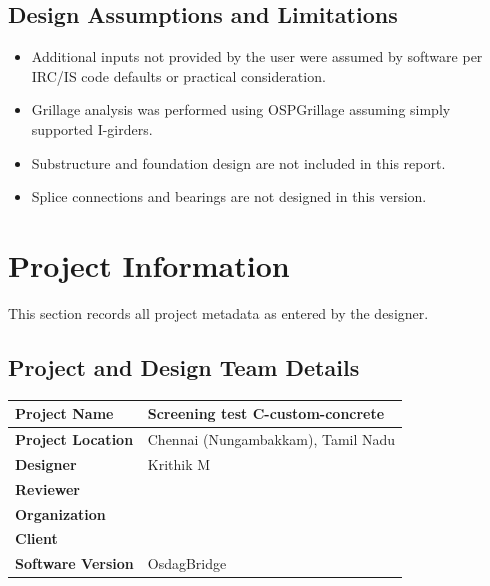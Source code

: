\documentclass[12pt,a4paper]{report}
\numberwithin{table}{chapter}
\numberwithin{figure}{chapter}
\begin{document}
\section*{Design Assumptions and Limitations}
\label{sec:assumptions}

\begin{itemize}
\item Additional inputs not provided by the user were assumed by software per IRC/IS code defaults or practical consideration.
\item Grillage analysis was performed using OSPGrillage assuming simply supported I-girders.
\item Substructure and foundation design are not included in this report.
\item Splice connections and bearings are not designed in this version.
\end{itemize}

\titleformat{\chapter}[block]{\normalfont\Large\bfseries\centering}{\thechapter}{1em}{}
\titlespacing*{\chapter}{0pt}{-30pt}{10pt}


\chapter{Project Information}

This section records all project metadata as entered by the designer.

\section{Project and Design Team Details}
\label{sec:project-details}

\begin{tabular}{|L{5.5cm}|L{8.5cm}|}
\hline
\textbf{Project Name} & Screening test C-custom-concrete \\
\hline
\textbf{Project Location} & Chennai (Nungambakkam), Tamil Nadu \\
\hline
\textbf{Designer} & Krithik M \\
\hline
\textbf{Reviewer} &  \\
\hline
\textbf{Organization} &  \\
\hline
\textbf{Client} &  \\
\hline
\textbf{Software Version} & OsdagBridge \\
\hline
\end{tabular}
\end{document}
